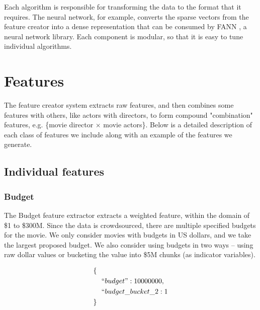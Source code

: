 \documentclass[journal]{IEEEtran}
\begin{document}
Each algorithm is responsible for transforming the data to the format that it requires.
The neural network, for example, converts the sparse vectors from the feature creator
into a dense representation that can be consumed by FANN \cite{fann}, a neural network library.  Each
component is modular, so that it is easy to tune individual algorithms.


\section{Features}
The feature creator system extracts raw features, and then combines some
features with others, like actors with directors, to form compound
"combination" features, e.g. \{movie director $\times$ movie actors\}.
Below is a detailed description of each class of features we include along with
an example of the features we generate.

\subsection{Individual features}
\subsubsection{Budget}
The Budget feature extractor extracts a weighted feature, within the domain of
\$1 to \$300M.  Since the data is crowdsourced, there are multiple specified
budgets for the movie.  We only consider movies with budgets in US dollars, and
we take the largest proposed budget.  We also consider using budgets in two
ways -- using raw dollar values or bucketing the value into \$5M chunks (as
indicator variables).

\begin{align*}
        \{ \ \ & \\
        &``budget": 10000000,\\
        &``budget\_bucket\_2: 1\\
        \} \ \ &
\end{align*}
\end{document}
